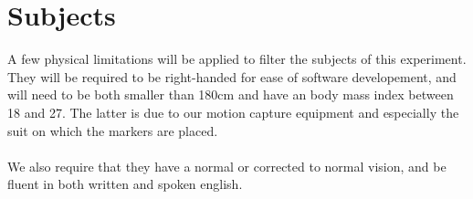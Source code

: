 \section{Subjects}

A few physical limitations will be applied to filter the subjects of this experiment. They will be required to be right-handed for ease of software developement, and will need to be both smaller than 180cm and have an body mass index between 18 and 27. The latter is due to our motion capture equipment and especially the suit on which the markers are placed.
\\\\
We also require that they have a normal or corrected to normal vision, and be fluent in both written and spoken english.
